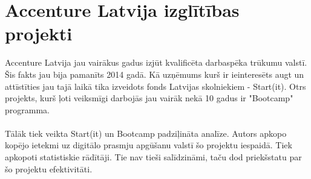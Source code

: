 \section{Accenture Latvija izglītības projekti}
Accenture Latvija jau vairākus gadus izjūt kvalificēta darbaspēka trūkumu valstī. Šis fakts jau bija pamanīts
2014 gadā. Kā uzņēmums kurš ir ieinteresēts augt un attīstīties jau tajā laikā tika izveidots fonds Latvijas
skolniekiem - Start(it). Otrs projekts, kurš ļoti veiksmīgi darbojās jau vairāk nekā 10 gadus ir "Bootcamp" programma.
\paragraph{}
Tālāk tiek veikta Start(it) un Bootcamp padziļināta analīze. Autors apkopo kopējo ietekmi uz digitālo
prasmju apgūšanu valstī šo projektu iespaidā. Tiek apkopoti statistiskie rādītāji. Tie nav tieši salīdzināmi,
taču dod priekšstatu par šo projektu efektivitāti.
